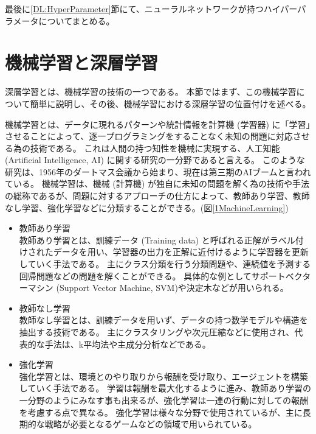 最後に\ref{DL:HyperParameter}節にて、ニューラルネットワークが持つハイパーパラメータについてまとめる。


\section{機械学習と深層学習} \label{DL:MachineandDeepLearning}

深層学習とは、機械学習の技術の一つである。
本節ではまず、この機械学習について簡単に説明し、その後、機械学習における深層学習の位置付けを述べる。

機械学習とは、データに現れるパターンや統計情報を計算機 (学習器) に「学習」させることによって、逐一プログラミングをすることなく未知の問題に対応させる為の技術である。
これは人間の持つ知性を機械に実現する、人工知能 (Artificial Intelligence, AI) に関する研究の一分野であると言える。
このような研究は、1956年のダートマス会議\cite{Dartmouth}から始まり、現在は第三期のAIブームと言われている。
機械学習は、機械 (計算機) が独自に未知の問題を解く為の技術や手法の総称であるが、問題に対するアプローチの仕方によって、教師あり学習、教師なし学習、強化学習などに分類することができる。(図\ref{1MachineLearning})

\begin{itemize}
  \item 教師あり学習\\
  教師あり学習とは、訓練データ (Training data) と呼ばれる正解がラベル付けされたデータを用い、学習器の出力を正解に近付けるように学習器を更新していく手法である。
  主にクラス分類を行う分類問題や、連続値を予測する回帰問題などの問題を解くことができる。
  具体的な例としてサポートベクターマシン (Support Vector Machine, SVM\cite{PatternRecognitionUsingGeneralizedPortraitMethod,TrainingAlgorithmforOptimalMarginClassifiers})や決定木などが用いられる。
  \item 教師なし学習\\
  教師なし学習とは、訓練データを用いず、データの持つ数学モデルや構造を抽出する技術である。
  主にクラスタリングや次元圧縮などに使用され、代表的な手法は、k平均法や主成分分析などである。
  \item 強化学習\\
  強化学習とは、環境とのやり取りから報酬を受け取り、エージェントを構築していく手法である。
  学習は報酬を最大化するように進み、教師あり学習の一分野のようにみなす事も出来るが、強化学習は一連の行動に対しての報酬を考慮する点で異なる。
  強化学習は様々な分野で使用されているが、主に長期的な戦略が必要となるゲームなどの領域で用いられている。
\end{itemize}


